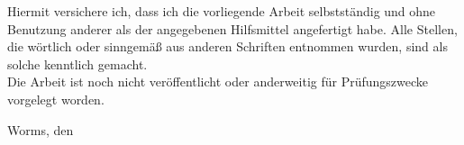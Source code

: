 
Hiermit versichere ich, dass ich die vorliegende Arbeit selbstständig und ohne Benutzung anderer als der angegebenen Hilfsmittel angefertigt habe. Alle Stellen, die wörtlich oder sinngemäß aus anderen Schriften entnommen wurden, sind als solche kenntlich gemacht.\\
Die Arbeit ist noch nicht veröffentlicht oder anderweitig für Prüfungszwecke vorgelegt worden.

\vspace{2\baselineskip}

Worms, den \einreichungsdatum